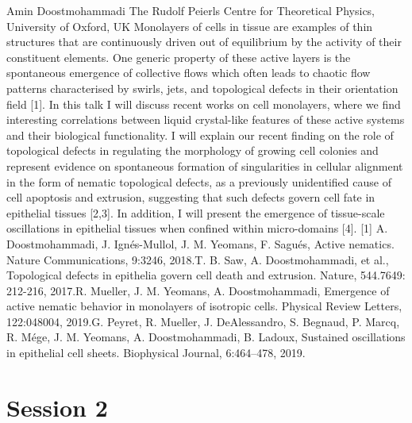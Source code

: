 \documentclass{article}
\begin{document}
{Amin Doostmohammadi}
{The Rudolf Peierls Centre for Theoretical Physics, University of Oxford, UK}
{Monolayers of cells in tissue are examples of thin structures that are continuously driven out of
equilibrium by the activity of their constituent elements. One generic property of these active
layers is the spontaneous emergence of collective flows which often leads to chaotic flow patterns
characterised by swirls, jets, and topological defects in their orientation field [1]. In this talk I
will discuss recent works on cell monolayers, where we find interesting correlations between liquid
crystal-like features of these active systems and their biological functionality.
I will explain our recent finding on the role of topological defects in regulating the morphology of
growing cell colonies and represent evidence on spontaneous formation of singularities in cellular
alignment in the form of nematic topological defects, as a previously unidentified cause of cell
apoptosis and extrusion, suggesting that such defects govern cell fate in epithelial tissues [2,3]. In
addition, I will present the emergence of tissue-scale oscillations in epithelial tissues when confined
within micro-domains [4].\newline\newline
\small{
[1] A. Doostmohammadi, J. Ignés-Mullol, J. M. Yeomans, F. Sagués, Active nematics. Nature
Communications, 9:3246, 2018.\newline
[2] T. B. Saw, A. Doostmohammadi, et al., Topological defects in epithelia govern cell death and
extrusion. Nature, 544.7649: 212-216, 2017.\newline
[3] R. Mueller, J. M. Yeomans, A. Doostmohammadi, Emergence of active nematic behavior in
monolayers of isotropic cells. Physical Review Letters, 122:048004, 2019.\newline
[4] G. Peyret, R. Mueller, J. DeAlessandro, S. Begnaud, P. Marcq, R. Mége, J. M. Yeomans,
A. Doostmohammadi, B. Ladoux, Sustained oscillations in epithelial cell sheets. Biophysical
Journal, 6:464–478, 2019.}}

\newpage
\section*{Session 2}

\end{document}
